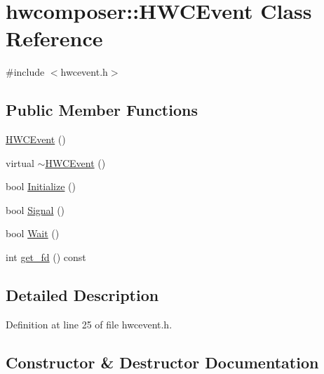 \hypertarget{classhwcomposer_1_1HWCEvent}{}\section{hwcomposer\+:\+:H\+W\+C\+Event Class Reference}
\label{classhwcomposer_1_1HWCEvent}


{\ttfamily \#include $<$hwcevent.\+h$>$}

\subsection*{Public Member Functions}
\begin{DoxyCompactItemize}
\item 
\mbox{\hyperlink{classhwcomposer_1_1HWCEvent_a23337d4e705665043c9180dd38125e14}{H\+W\+C\+Event}} ()
\item 
virtual \mbox{\hyperlink{classhwcomposer_1_1HWCEvent_acdf1ef033d2add5c6651ee89c4710130}{$\sim$\+H\+W\+C\+Event}} ()
\item 
bool \mbox{\hyperlink{classhwcomposer_1_1HWCEvent_a5b5ee0d26d11c5697e20cde63a255e97}{Initialize}} ()
\item 
bool \mbox{\hyperlink{classhwcomposer_1_1HWCEvent_a3cd16bda8f4fd8bcbda6dae72ff15f57}{Signal}} ()
\item 
bool \mbox{\hyperlink{classhwcomposer_1_1HWCEvent_a013f137de83e0e45988d72317179a7ef}{Wait}} ()
\item 
int \mbox{\hyperlink{classhwcomposer_1_1HWCEvent_a103324deefcbf4402fd302b737474416}{get\+\_\+fd}} () const
\end{DoxyCompactItemize}


\subsection{Detailed Description}


Definition at line 25 of file hwcevent.\+h.



\subsection{Constructor \& Destructor Documentation}
\mbox{\label{classhwcomposer_1_1HWCEvent_a23337d4e705665043c9180dd38125e14}} 

